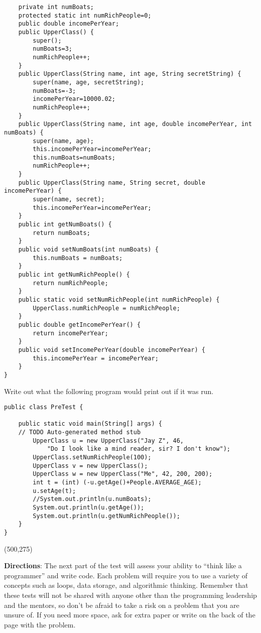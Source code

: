 \documentclass[11pt,fleqn]{article}
\begin{document}
\begin{verbatim}
	private int numBoats;
	protected static int numRichPeople=0;
	public double incomePerYear;
	public UpperClass() {
		super();
		numBoats=3;
		numRichPeople++;
	}
	public UpperClass(String name, int age, String secretString) {
		super(name, age, secretString);
		numBoats=-3;
		incomePerYear=10000.02;
		numRichPeople++;
	}
	public UpperClass(String name, int age, double incomePerYear, int numBoats) {
		super(name, age);
		this.incomePerYear=incomePerYear;
		this.numBoats=numBoats;
		numRichPeople++;
	}
	public UpperClass(String name, String secret, double incomePerYear) {
		super(name, secret);
		this.incomePerYear=incomePerYear;
	}
	public int getNumBoats() {
		return numBoats;
	}
	public void setNumBoats(int numBoats) {
		this.numBoats = numBoats;
	}
	public int getNumRichPeople() {
		return numRichPeople;
	}
	public static void setNumRichPeople(int numRichPeople) {
		UpperClass.numRichPeople = numRichPeople;
	}
	public double getIncomePerYear() {
		return incomePerYear;
	}
	public void setIncomePerYear(double incomePerYear) {
		this.incomePerYear = incomePerYear;
	}
}
\end{verbatim}

\newpage

Write out what the following program would print out if it was run. \\

\begin{verbatim}
public class PreTest {

	public static void main(String[] args) {
	// TODO Auto-generated method stub
		UpperClass u = new UpperClass("Jay Z", 46, 
			"Do I look like a mind reader, sir? I don't know");
		UpperClass.setNumRichPeople(100);
		UpperClass v = new UpperClass();
		UpperClass w = new UpperClass("Me", 42, 200, 200);
		int t = (int) (-u.getAge()+People.AVERAGE_AGE);
		u.setAge(t);
		//System.out.println(u.numBoats);
		System.out.println(u.getAge());
		System.out.println(u.getNumRichPeople());
	}
}
\end{verbatim}

\framebox(500,275){}

\newpage

\textbf{Directions}: The next part of the test will assess your ability to ``think like a programmer''
and write code. Each problem will require you to use a variety of concepts such as loops, data storage,
and algorithmic thinking. Remember that these tests will not be shared with anyone other than the programming
leadership and the mentors, so don't be afraid to take a risk on a problem that you are unsure of. If
you need more space, ask for extra paper or write on the back of the page with the problem.
\end{document}
